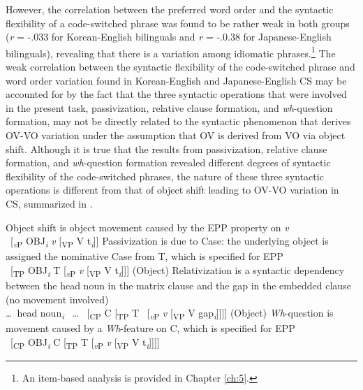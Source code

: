   However, the correlation between the preferred word order and the syntactic flexibility of a code-switched phrase was found to be rather weak in both groups (\textit{r} = -.033 for Korean-English bilinguals and \textit{r} = -.0.38 for Japanese-English bilinguals), revealing that there is a variation among idiomatic phrases.\footnote{\textrm{An item-based analysis is provided in Chapter \ref{ch:5}.} } The weak correlation between the syntactic flexibility of the code-switched phrase and word order variation found in Korean-English and Japanese-English \ac{CS} may be accounted for by the fact that the three syntactic operations that were involved in the present task, passivization, relative clause formation, and \textit{wh}{}-question formation, may not be directly related to the syntactic phenomenon that derives \ac{OV}-\ac{VO} variation under the assumption that \ac{OV} is derived from \ac{VO} via object shift. Although it is true that the results from passivization, relative clause formation, and \textit{wh}{}-question formation revealed different degrees of syntactic flexibility of the code-switched phrases, the nature of these three syntactic operations is different from that of object shift leading to \ac{OV}-\ac{VO} variation in \ac{CS}, summarized in .
 
 \ea\label{ex:41}
    \ea Object shift is object movement caused by the \ac{EPP} property on \textit{v}\footnotemark \\
    ~[\textit{\textsubscript{v}}\textsubscript{P} OBJ\textit{\textsubscript{i} } \textit{v} [\textsubscript{VP} V t\textit{\textsubscript{i}}]]
    \ex  Passivization is due to Case: the underlying object is assigned the nominative Case from T, which is specified for \ac{EPP} \\
    ~[\textsubscript{TP} OBJ\textit{\textsubscript{i} } T [\textit{\textsubscript{v}}\textsubscript{P} \textit{v} [\textsubscript{VP} V t\textit{\textsubscript{i}}]]]
    \ex (Object) Relativization is a syntactic dependency between the head noun in the matrix clause and the gap in the embedded clause (no movement involved) \\
    \ldots ~head noun\textit{\textsubscript{i}}~ \ldots ~ [\textsubscript{CP} C [\textsubscript{TP} T ~[\textit{\textsubscript{v}}\textsubscript{P} \textit{v} [\textsubscript{VP} V gap\textit{\textsubscript{i}}]]]]
    \ex  (Object) \textit{Wh}{}-question is movement caused by a  \textit{Wh}{}-feature on C, which is specified for \ac{EPP} \\
    ~[\textsubscript{CP} OBJ\textit{\textsubscript{i} } C [\textsubscript{TP} T [\textit{\textsubscript{v}}\textsubscript{P} \textit{v} [\textsubscript{VP} V t\textit{\textsubscript{i}}]]]]
    \z
 \z
 
